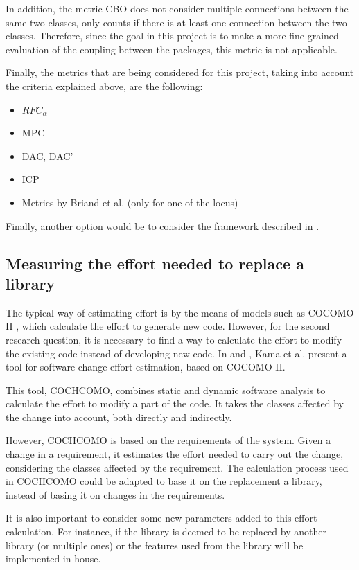 In addition, the metric CBO does not consider multiple connections between the same two classes, only counts if there is at least one connection between the two classes. Therefore, since the goal in this project is to make a more fine grained evaluation of the coupling between the packages, this metric is not applicable.

Finally, the metrics that are being considered for this project, taking into account the criteria explained above, are the following:

\begin{itemize} %
    \item $RFC_\alpha$
    \item MPC
    \item DAC, DAC'
    \item ICP
    \item Metrics by Briand et al. (only for one of the locus)
\end{itemize}

Finally, another option would be to consider the framework described in \cite{briand1999unified}.

\subsection{Measuring the effort needed to replace a library}
The typical way of estimating effort is by the means of models such as COCOMO II \cite{sharma2011analysis}, which calculate the effort to generate new code. However, for the second research question, it is necessary to find a way to calculate the effort to modify the existing code instead of developing new code. In \cite{kama2014cochcomo} and \cite{asl2013change}, Kama et al. present a tool for software change effort estimation, based on COCOMO II.

This tool, COCHCOMO, combines static and dynamic software analysis to calculate the effort to modify a part of the code. It takes the classes affected by the change into account, both directly and indirectly.

However, COCHCOMO is based on the requirements of the system. Given a change in a requirement, it estimates the effort needed to carry out the change, considering the classes affected by the requirement. The calculation process used in COCHCOMO could be adapted to base it on the replacement a library, instead of basing it on changes in the requirements.

It is also important to consider some new parameters added to this effort calculation. For instance, if the library is deemed to be replaced by another library (or multiple ones) or the features used from the library will be implemented in-house.

